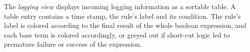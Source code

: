 The \emph{logging view} displays incoming logging information as a sortable
table. A table entry contains a time stamp, the rule's label and its
condition. The rule's label is colored according to the final result of the
whole boolean expression, and each base term is colored accordingly, or greyed
out if short-cut logic led to premature failure or success of the expression.
